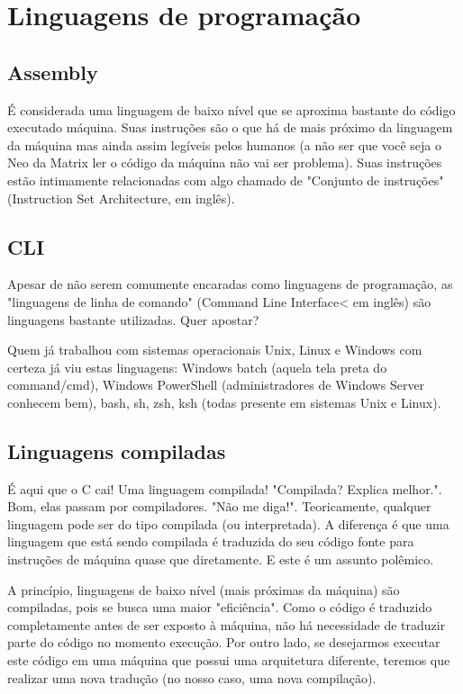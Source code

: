 \section{Linguagens de programação}

\subsection{Assembly}

É considerada uma linguagem de baixo nível que se aproxima bastante do código executado máquina. Suas instruções são o que há de mais próximo da linguagem da máquina mas ainda assim legíveis pelos humanos (a não ser que você seja o Neo da Matrix ler o código da máquina não vai ser problema). Suas instruções estão intimamente relacionadas com algo chamado de "Conjunto de instruções" (Instruction Set Architecture, em inglês).

\subsection{CLI}

Apesar de não serem comumente encaradas como linguagens de programação, as "linguagens de linha de comando" (Command Line Interface< em inglês) são linguagens bastante utilizadas. Quer apostar?

Quem já trabalhou com sistemas operacionais Unix, Linux e Windows com certeza já viu estas linguagens: Windows batch (aquela tela preta do command/cmd), Windows PowerShell (administradores de Windows Server conhecem bem), bash, sh, zsh, ksh (todas presente em sistemas Unix e Linux).

\subsection{Linguagens compiladas}

É aqui que o C cai! Uma linguagem compilada!
"Compilada? Explica melhor.". Bom, elas passam por compiladores. "Não me diga!".
Teoricamente, qualquer linguagem pode ser do tipo compilada (ou interpretada). A diferença é que uma linguagem que está sendo compilada é traduzida do seu código fonte para instruções de máquina quase que diretamente. E este é um assunto polêmico.

A princípio, linguagens de baixo nível (mais próximas da máquina) são compiladas, pois se busca uma maior "eficiência". Como o código é traduzido completamente antes de ser exposto à máquina, não há necessidade de traduzir parte do código no momento execução. Por outro lado, se desejarmos executar este código em uma máquina que possui uma arquitetura diferente, teremos que realizar uma nova tradução (no nosso caso, uma nova compilação).

